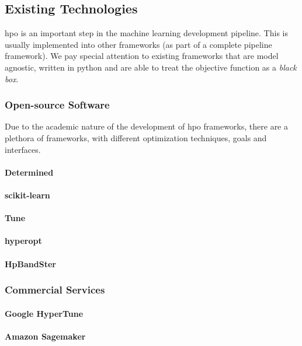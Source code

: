 
\subsection{Existing Technologies}

\acrfull{hpo} is an important step in the machine learning development pipeline. This is usually implemented into other frameworks (as part of a complete pipeline framework). We pay special attention to existing frameworks that are model agnostic, written in \acrfull{python} and are able to treat the objective function as a \textit{black box}.

\subsubsection{Open-source Software}

Due to the academic nature of the development of \acrshort{hpo} frameworks, there are a plethora of frameworks, with different optimization techniques, goals and interfaces.

\paragraph{Determined}

\paragraph{scikit-learn}

\paragraph{Tune}

\paragraph{hyperopt}

\paragraph{HpBandSter}

\subsubsection{Commercial Services}

\paragraph{Google HyperTune}

\paragraph{Amazon Sagemaker}
